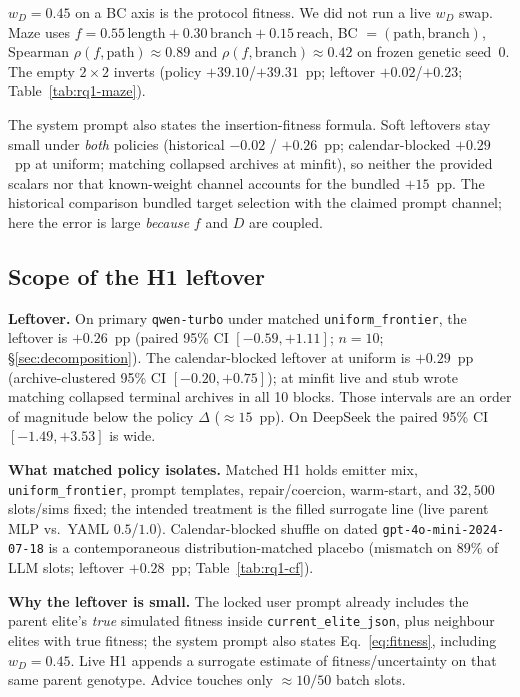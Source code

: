 \documentclass[preprint,12pt]{elsarticle}
\begin{document}
$w_D{=}0.45$ on a BC axis is the protocol fitness. We did not run a live $w_D$ swap. Maze uses $f=0.55\,\mathrm{length}+0.30\,\mathrm{branch}+0.15\,\mathrm{reach}$, BC $=(\mathrm{path},\mathrm{branch})$, Spearman $\rho(f,\mathrm{path}){\approx}0.89$ and $\rho(f,\mathrm{branch}){\approx}0.42$ on frozen genetic seed~0. The empty $2\times2$ inverts (policy $+39.10$/$+39.31$~pp; leftover $+0.02$/$+0.23$; Table~\ref{tab:rq1-maze}).

The system prompt also states the insertion-fitness formula. Soft leftovers stay small under \emph{both} policies (historical $-0.02$ / $+0.26$~pp; calendar-blocked $+0.29$~pp at uniform; matching collapsed archives at minfit), so neither the provided scalars nor that known-weight channel accounts for the bundled $+15$~pp. The historical comparison bundled target selection with the claimed prompt channel; here the error is large \emph{because} $f$ and $D$ are coupled.

\subsection{Scope of the H1 leftover}
\label{sec:h1-impl-threat}

\textbf{Leftover.} On primary \texttt{qwen-turbo} under matched \texttt{uniform\_frontier}, the leftover is $+0.26$~pp (paired 95\% CI $[-0.59,+1.11]$; $n{=}10$; \S\ref{sec:decomposition}). The calendar-blocked leftover at uniform is $+0.29$~pp (archive-clustered 95\% CI $[-0.20,+0.75]$); at minfit live and stub wrote matching collapsed terminal archives in all 10 blocks. Those intervals are an order of magnitude below the policy $\Delta$ (${\approx}15$~pp). On DeepSeek the paired 95\% CI $[-1.49,+3.53]$ is wide.

\textbf{What matched policy isolates.} Matched H1 holds emitter mix, \texttt{uniform\_frontier}, prompt templates, repair/coercion, warm-start, and $32{,}500$ slots/sims fixed; the intended treatment is the filled surrogate line (live parent MLP vs.\ YAML $0.5$/$1.0$). Calendar-blocked shuffle on dated \texttt{gpt-4o-mini-2024-07-18} is a contemporaneous distribution-matched placebo (mismatch on $89\%$ of LLM slots; leftover $+0.28$~pp; Table~\ref{tab:rq1-cf}).

\textbf{Why the leftover is small.} The locked user prompt already includes the parent elite's \emph{true} simulated fitness inside \texttt{current\_elite\_json}, plus neighbour elites with true fitness; the system prompt also states Eq.~\eqref{eq:fitness}, including $w_D{=}0.45$. Live H1 appends a surrogate estimate of fitness/uncertainty on that same parent genotype. Advice touches only ${\approx}10/50$ batch slots.
\end{document}
